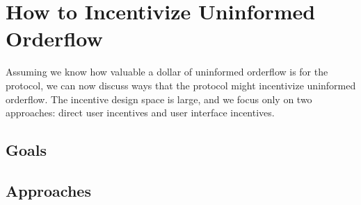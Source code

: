 \section{How to Incentivize Uninformed Orderflow} \label{section:how-to-incentivize}

Assuming we know how valuable a dollar of uninformed orderflow is for the protocol, we can now discuss ways that the protocol might incentivize uninformed orderflow. 
The incentive design space is large, and we focus only on two approaches: direct user incentives and user interface incentives.

\subsection{Goals}


\subsection{Approaches}


